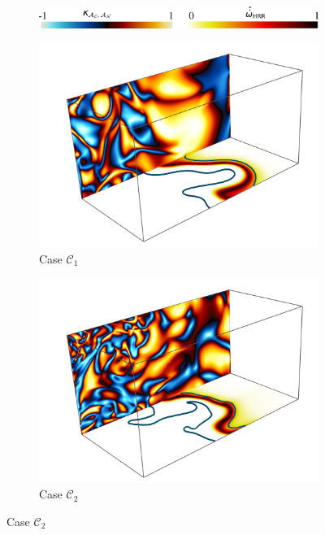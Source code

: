\documentclass[review,times,sort&compress]{elsarticle}
\begin{document}
\begin{figure}[htpb]
\centering
\begin{subfigure}{.48\textwidth}
\hspace{-5em}
\includegraphics[width=1.5\textwidth]{./figs/kappa/cmap.pdf}
\end{subfigure}

\vspace{2em}

\begin{subfigure}{.48\textwidth}
\centering
\includegraphics[width=.99\textwidth]{./figs/kappa/case1.pdf}
\caption{Case $\mathcal{C}_1$}
\label{fig:kappa_contour_case1}
\end{subfigure}
%
\begin{subfigure}{.48\textwidth}
\centering
\includegraphics[width=.99\textwidth]{./figs/kappa/case2.pdf}
\caption{Case $\mathcal{C}_2$}
\label{fig:kappa_contour_case2}
\end{subfigure}


\end{figure}
\end{document}
